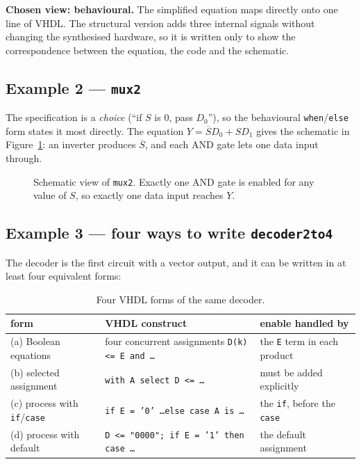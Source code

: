 \textbf{Chosen view: behavioural.} The simplified equation maps directly onto one
line of VHDL. The structural version adds three internal signals without changing
the synthesised hardware, so it is written only to show the correspondence between
the equation, the code and the schematic.

\subsection{Example 2 --- \texttt{mux2}}

The specification is a \emph{choice} (``if $S$ is 0, pass $D_0$''), so the
behavioural \texttt{when}/\texttt{else} form states it most directly. The equation
$Y = \overline{S}D_0 + SD_1$ gives the schematic in Figure~\ref{fig:lab00-mux-sch}:
an inverter produces $\overline{S}$, and each AND gate lets one data input through.

\begin{figure}[H]
\centering

\caption{Schematic view of \texttt{mux2}. Exactly one AND gate is enabled for any
value of $S$, so exactly one data input reaches $Y$.}
\label{fig:lab00-mux-sch}
\end{figure}

\subsection{Example 3 --- four ways to write \texttt{decoder2to4}}

The decoder is the first circuit with a vector output, and it can be written in at
least four equivalent forms:

\begin{table}[H]
\centering
\caption{Four VHDL forms of the same decoder.}
\label{tab:lab00-decforms}
\small
\begin{tabular}{>{\raggedright\arraybackslash}p{3.6cm}>{\raggedright\arraybackslash}p{6.4cm}>{\raggedright\arraybackslash}p{4.4cm}}
\toprule
form & VHDL construct & enable handled by \\
\midrule
(a) Boolean equations & four concurrent assignments \texttt{D(k) <= E and \dots} & the \texttt{E} term in each product \\
(b) selected assignment & \texttt{with A select D <= \dots} & must be added explicitly \\
(c) process with \texttt{if}/\texttt{case} & \texttt{if E = '0' \dots else case A is \dots} & the \texttt{if}, before the \texttt{case} \\
(d) process with default & \texttt{D <= "0000"; if E = '1' then case \dots} & the default assignment \\
\bottomrule
\end{tabular}
\end{table}

